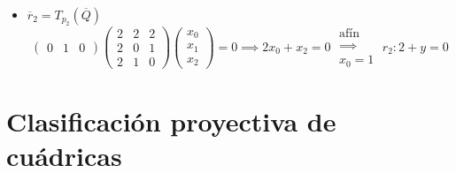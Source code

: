 \begin{example}
\begin{itemize}
\[      \]
    \item $\overline{r}_2 = T_{p_2}\left( \overline{Q} \right)$
      \[
        \begin{pmatrix}
          0 & 1 & 0
        \end{pmatrix}
        \begin{pmatrix}
          2 & 2 & 2 \\
          2 & 0 & 1 \\
          2 & 1 & 0
        \end{pmatrix}
        \begin{pmatrix}
          x_0 \\ x_1 \\ x_2
        \end{pmatrix}
        = 0 \implies 2x_0 + x_2 = 0 \; \substack{\text{afín} \\ \implies \\ x_0 = 1}\; r_2 \colon 2 + y = 0
      \]
  \end{itemize}
\end{example}

\section{Clasificación proyectiva de cuádricas}

